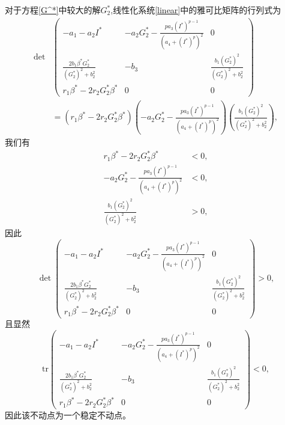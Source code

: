 对于方程\ref{G^*}中较大的解$G_2^*$,线性化系统\ref{linear}中的雅可比矩阵的行列式为
\begin{equation}
    \begin{aligned}
        \det&\begin{pmatrix}
            -a_1-a_2I^*                                & -a_2G_2^*-\frac{pa_3(I^*)^{p-1}}{(a_4+(I^*)^p)^2} & 0                                      \\
            \frac{2b_1\beta^*G_2^*}{(G_2^*)^2 + b_2^2} & -b_3                                              & \frac{b_1(G_2^*)^2}{(G_2^*)^2 + b_2^2} \\
            r_1\beta^*-2r_2G_2^*\beta^*                & 0                                                 & 0
        \end{pmatrix}\\
        &=(r_1\beta^*-2r_2G_2^*\beta^*)(-a_2G_2^*-\frac{pa_3(I^*)^{p-1}}{(a_4+(I^*)^p)^2})( \frac{b_1(G_2^*)^2}{(G_2^*)^2 + b_2^2}),
    \end{aligned}
\end{equation}
我们有
\begin{equation}
    \begin{aligned}
        r_1\beta^*-2r_2G_2^*\beta^*                       & <0, \\
        -a_2G_2^*-\frac{pa_3(I^*)^{p-1}}{(a_4+(I^*)^p)^2} & <0, \\
        \frac{b_1(G_2^*)^2}{(G_2^*)^2 + b_2^2}            & >0,
    \end{aligned}
\end{equation}
因此
\begin{equation}
    \det \begin{pmatrix}
        -a_1-a_2I^*                                & -a_2G_2^*-\frac{pa_3(I^*)^{p-1}}{(a_4+(I^*)^p)^2} & 0                                      \\
        \frac{2b_1\beta^*G_2^*}{(G_2^*)^2 + b_2^2} & -b_3                                              & \frac{b_1(G_2^*)^2}{(G_2^*)^2 + b_2^2} \\
        r_1\beta^*-2r_2G_2^*\beta^*                & 0                                                 & 0
    \end{pmatrix}>0,
\end{equation}
且显然
    \begin{equation}
        \text{tr}\begin{pmatrix}
            -a_1-a_2I^*                                & -a_2G_2^*-\frac{pa_3(I^*)^{p-1}}{(a_4+(I^*)^p)^2} & 0                                      \\
            \frac{2b_1\beta^*G_2^*}{(G_2^*)^2 + b_2^2} & -b_3                                              & \frac{b_1(G_2^*)^2}{(G_2^*)^2 + b_2^2} \\
            r_1\beta^*-2r_2G_2^*\beta^*                & 0                                                 & 0
        \end{pmatrix}<0,
    \end{equation}
    因此该不动点为一个稳定不动点。
    
